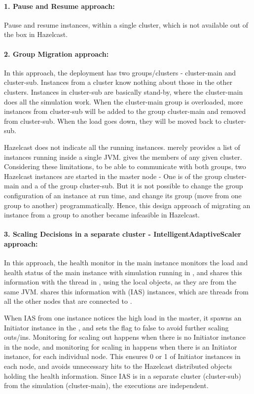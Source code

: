\paragraph*{1. Pause and Resume approach:}
Pause and resume instances, within a single cluster, which is not available out of the box in Hazelcast.

\paragraph*{2. Group Migration approach:}
In this approach, the deployment has two groups/clusters - cluster-main and cluster-sub. Instances from a cluster know nothing about those in the other clusters. Instances in cluster-sub are basically stand-by, where the cluster-main does all the simulation work. When the cluster-main group is overloaded, more instances from cluster-sub will be added to the group cluster-main and removed from cluster-sub. When the load goes down, they will be moved back to cluster-sub. 

Hazelcast does not indicate all the running instances.  merely provides a list of instances running inside a single JVM.  gives the members of any given cluster. Considering these limitations, to be able to communicate with both groups, two Hazelcast instances are started in the master node - One is of the group cluster-main and a  of the group cluster-sub. But it is not possible to change the group configuration of an instance at run time, and change its group (move from one group to another) programmatically. Hence, this design approach of migrating an instance from a group to another became infeasible in Hazelcast.

\paragraph*{3. Scaling Decisions in a separate cluster - IntelligentAdaptiveScaler approach:}
In this approach, the health monitor in the main instance monitors the load and health status of the main instance with simulation running in , and shares this information with the  thread in , using the local objects, as they are from the same JVM.  shares this information with  (IAS) instances, which are threads from all the other nodes that are connected to . 

When IAS from one instance notices the high load in the master, it spawns an Initiator instance in the , and sets the flag to false to avoid further scaling outs/ins. Monitoring for scaling out happens when there is no Initiator instance in the node, and monitoring for scaling in happens when there is an Initiator instance, for each individual node. This ensures 0 or 1 of Initiator instances in each node, and avoids unnecessary hits to the Hazelcast distributed objects holding the health information. Since IAS is in a separate cluster (cluster-sub) from the simulation (cluster-main), the executions are independent. 

